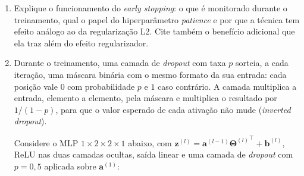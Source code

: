 \documentclass{dlproblemset}
\begin{document}
\begin{enumerate}[1)]
    \item Explique o funcionamento do \textit{early stopping}: o que é monitorado durante o treinamento, qual o papel do hiperparâmetro \textit{patience} e por que a técnica tem efeito análogo ao da regularização L2. Cite também o benefício adicional que ela traz além do efeito regularizador.

    \item Durante o treinamento, uma camada de \textit{dropout} com taxa $p$ sorteia, a cada iteração, uma máscara binária com o mesmo formato da sua entrada: cada posição vale $0$ com probabilidade $p$ e $1$ caso contrário. A camada multiplica a entrada, elemento a elemento, pela máscara e multiplica o resultado por $1/(1-p)$, para que o valor esperado de cada ativação não mude (\textit{inverted dropout}).

    Considere o MLP $1 \times 2 \times 2 \times 1$ abaixo, com $\mathbf{z}^{(l)} = \mathbf{a}^{(l-1)}{\mathbf{\Theta}^{(l)}}^{\top} + \mathbf{b}^{(l)}$, ReLU nas duas camadas ocultas, saída linear e uma camada de \textit{dropout} com $p = 0{,}5$ aplicada sobre $\mathbf{a}^{(1)}$:

    \begin{center}
    \end{center}


\end{enumerate}
\end{document}
